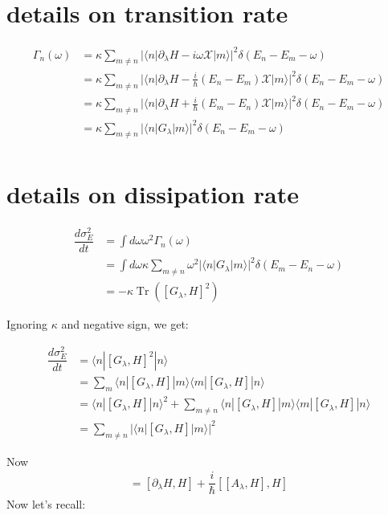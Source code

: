\documentclass[11pt,a4paper]{article}
\DeclareMathOperator{\Tr}{Tr}
\begin{document}
\section{details on transition rate}\label{sec.transition_rate}
\begin{align}
 \Gamma_n (\omega) &= \kappa  \sum_{m \neq n} |\langle n | \partial_{\lambda} H - i \omega \mathcal{X} | m \rangle |^2 \delta(E_n-E_m- \omega) \\
 &= \kappa  \sum_{m \neq n} |\langle n | \partial_{\lambda} H - \frac{i}{\hbar} (E_n-E_m)\mathcal{X} | m \rangle |^2 \delta(E_n-E_m- \omega) \\
 &= \kappa  \sum_{m \neq n} |\langle n | \partial_{\lambda} H + \frac{i}{\hbar} (E_m-E_n)\mathcal{X} | m \rangle |^2 \delta(E_n-E_m- \omega) \\
 &= \kappa  \sum_{m \neq n} |\langle n | G_{\lambda} | m \rangle |^2 \delta(E_n-E_m- \omega) \\
\end{align}

\section{details on dissipation rate}\label{sec.dissipation_rate}

\begin{align}
 \dfrac{d \sigma^2_E}{dt}&= \int d\omega \omega^2 \Gamma_n (\omega)\\
  &=\int d\omega \kappa\sum_{m \neq n}  \omega^2 |\langle n | G_{\lambda} | m \rangle |^2 \delta(E_m-E_n- \omega)\\
  &=-\kappa \Tr ([G_{\lambda}, H]^2)
\end{align}

Ignoring $\kappa$ and negative sign, we get:

\begin{align}
\dfrac{d \sigma^2_E}{dt}&=  \langle n |  [G_{\lambda}, H]^2  |    n \rangle  \\
&= \sum_{m} \langle n |  [G_{\lambda}, H]|  m \rangle \langle m |  [G_{\lambda}, H]  |    n \rangle \\
&= \langle n |  [G_{\lambda}, H]|  n \rangle ^2   +   \sum_{m \neq n} \langle n |  [G_{\lambda}, H]|  m \rangle \langle m |  [G_{\lambda}, H]  |    n \rangle \\
&=  \sum_{m \neq n} |\langle n |  [G_{\lambda}, H]|  m \rangle |^2
\end{align}

Now \begin{align*}
 [G_{\lambda}, H]= [\partial_{\lambda} H,H] + \dfrac{i}{\hbar} [[A_{\lambda} , H],H]
\end{align*}
Now let's recall:
\end{document}
